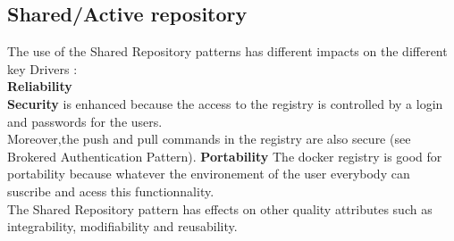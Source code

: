 \subsection{Shared/Active repository} 
The use of the Shared Repository patterns has different impacts on the different key Drivers : \\ 
\textbf{Reliability} \\
\textbf{Security} is enhanced because the access to the registry is controlled by a login and passwords for the users. \\
Moreover,the push and pull commands in the registry are also secure (see Brokered Authentication Pattern).
\textbf{Portability} The docker registry is good for portability because whatever the environement of the user everybody can suscribe and acess this functionnality.\\

The Shared Repository pattern has effects on other quality attributes such as integrability, modifiability and reusability. 

